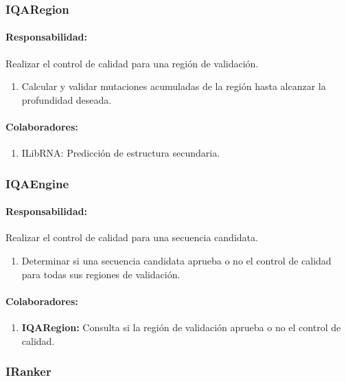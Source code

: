   \subsubsection{IQARegion}
    \paragraph{Responsabilidad:} Realizar el control de calidad para una
regi\'on de validaci\'on.
      \begin{enumerate}
       \item Calcular y validar mutaciones acumuladas de la regi\'on hasta
alcanzar la profundidad deseada.
      \end{enumerate}
    \paragraph{Colaboradores:}
      \begin{enumerate}
       \item ILibRNA: Predicci\'on de estructura secundaria.
      \end{enumerate}

  \subsubsection{IQAEngine}
    \paragraph{Responsabilidad:} Realizar el control de calidad para una
secuencia candidata.
      \begin{enumerate}             
       \item Determinar si una secuencia candidata aprueba o no el control de
calidad para todas sus regiones de validaci\'on.
      \end{enumerate}
    \paragraph{Colaboradores:}
      \begin{enumerate}
       \item \textbf{IQARegion:} Consulta si la regi\'on de validaci\'on aprueba
o no el control de calidad.
      \end{enumerate}

  \subsubsection{IRanker}
